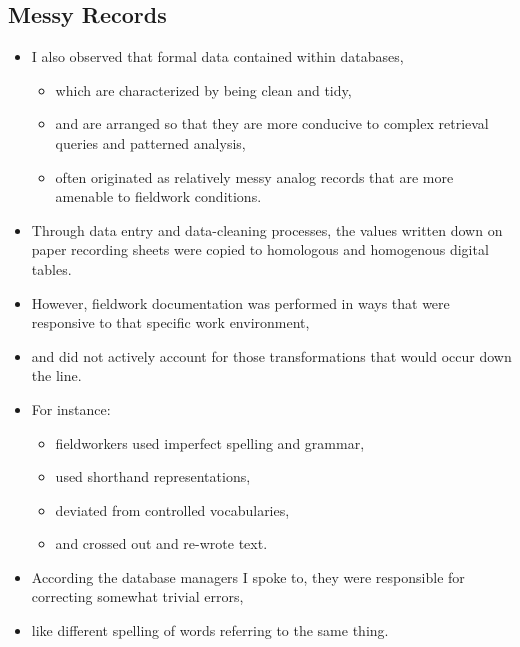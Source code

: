 \documentclass{article}
\begin{document}
\subsection{Messy Records}
\begin{itemize}
  \item I also observed that formal data contained within databases,
  \begin{itemize}
    \item which are characterized by being clean and tidy,
    \item and are arranged so that they are more conducive to complex retrieval queries and patterned analysis,
    \item often originated as relatively messy analog records that are more amenable to fieldwork conditions.
  \end{itemize}\vspace{1em}

  \item Through data entry and data-cleaning processes, the values written down on paper recording sheets were copied to homologous and homogenous digital tables.\\
  
  \item However, fieldwork documentation was performed in ways that were responsive to that specific work environment,
  \item and did not actively account for those transformations that would occur down the line.\\
  
  \item For instance:
  \begin{itemize}
    \item fieldworkers used imperfect spelling and grammar,
    \item used shorthand representations,
    \item deviated from controlled vocabularies,
    \item and crossed out and re-wrote text.
  \end{itemize}\vspace{1em}

  \item According the database managers I spoke to, they were responsible for correcting somewhat trivial errors,\\
  \item like different spelling of words referring to the same thing.\\
  

\end{itemize}
\end{document}

